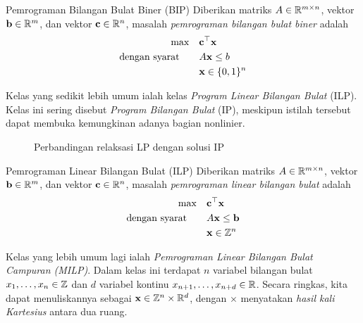 \begin{general}{Pemrograman Bilangan Bulat Biner (BIP)}{\npcomplete}
Diberikan matriks $A \in {\mathbb{R}}^{m\times n}$, vektor $\mathbf{b} \in {\mathbb{R}}^m$, dan vektor $\mathbf{c} \in {\mathbb{R}}^n$, masalah \emph{pemrograman bilangan bulat biner} adalah
\begin{equation}
\label{eq:BIP}
\begin{split}
\max \quad & \mathbf{c}^\top \mathbf{x}\\
\mbox{dengan syarat}\quad  \quad & A\mathbf{x} \leq b\\
& \mathbf{x} \in \{0,1\}^n
\end{split}
\end{equation}
\end{general}
Kelas yang sedikit lebih umum ialah kelas \emph{Program Linear Bilangan Bulat} (ILP). Kelas ini sering disebut \emph{Program Bilangan Bulat} (IP), meskipun istilah tersebut dapat membuka kemungkinan adanya bagian nonlinier.


\begin{figure}
\caption{Perbandingan relaksasi LP dengan solusi IP}
\end{figure}

\begin{general}{Pemrograman Linear Bilangan Bulat (ILP)}{\npcomplete}
Diberikan matriks $A \in {\mathbb{R}}^{m\times n}$, vektor $\mathbf{b} \in {\mathbb{R}}^m$, dan vektor $\mathbf{c} \in {\mathbb{R}}^n$, masalah \emph{pemrograman linear bilangan bulat} adalah
\begin{equation}
\label{eq:ILP}
\begin{split}
\max \quad & \mathbf{c}^\top \mathbf{x}\\
\mbox{dengan syarat}\quad  \quad & A\mathbf{x} \leq \mathbf{b}\\
& \mathbf{x} \in {\mathbb{Z}}^n
\end{split}
\end{equation}
\end{general}

Kelas yang lebih umum lagi ialah \emph{Pemrograman Linear Bilangan Bulat Campuran (MILP)}. Dalam kelas ini terdapat $n$ variabel bilangan bulat $x_1, \dots, x_n \in {\mathbb{Z}}$ dan $d$ variabel kontinu $x_{n+1}, \dots, x_{n+d} \in {\mathbb{R}}$. Secara ringkas, kita dapat menuliskannya sebagai $\mathbf{x} \in {\mathbb{Z}}^n \times {\mathbb{R}}^d$, dengan $\times$ menyatakan \emph{hasil kali Kartesius} antara dua ruang.   

